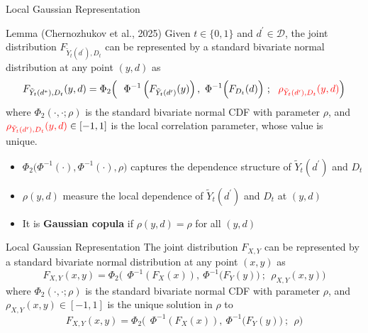 \documentclass[aspectratio=1610, 9pt]{beamer}
\begin{document}
\begin{frame}{Local Gaussian Representation}
\label{lemma:LGR}
    \begin{block}{Lemma (Chernozhukov et al., 2025)}
        Given $t\in\{0,1\}$ and $d^\prime\in\mathcal{D}$, the joint distribution $F_{\tilde{Y}_t(d^\prime),D_t}$ can be represented by a standard bivariate normal distribution at any point $(y,d)$ as
        $$F_{\tilde{Y}_{t}(d^{*}),D_{t}}(y,d)=\Phi_2\Big( \ 
        \ \Phi^{-1}\left(F_{\tilde{Y}_{t}(d^\prime)}(y) \right),\ \Phi^{-1}\Big( F_{D_t}(d)\Big) \ ;\ \ \textcolor{red}{\rho_{\tilde{Y}_{t}(d^\prime),D_{t}}(y,d)} \Big)$$ where $\Phi_2(\cdot,\cdot;\rho)$ is the standard bivariate normal CDF with parameter $\rho$, and $\textcolor{red}{\rho_{\tilde{Y}_{t}(d^\prime),D_{t}}(y,d)}\in[-1,1]$ is the local correlation parameter, whose value is unique.\ \ 
    \end{block}
    
    \vspace{0.4cm}
    \begin{itemize}
      \item $\Phi_2\Big(\Phi^{-1}(\cdot),\Phi^{-1}(\cdot),\rho\Big)$ captures the dependence structure of $\tilde{Y}_t(d^\prime)$ and $D_t$
      \item $\rho(y,d)$ measure the local dependence of $\tilde{Y}_t(d^\prime)$ and $D_t$ at $(y,d)$
      \item It is \textbf{Gaussian copula} if $\rho(y,d)=\rho$ for all $(y,d)$

    \end{itemize}
    \vspace{0.5cm}
\hyperlink{slides:LGR}{\beamerreturnbutton}
\end{frame}

\begin{frame}{Local Gaussian Representation} \label{def:LGR}
   The joint distribution $F_{X,Y}$ can be represented by a standard bivariate normal distribution at any point $(x,y)$ as
        $$F_{X,Y}(x,y)=\Phi_2\Big( \ 
        \ \Phi^{-1}\left(F_{X}(x) \right),\ \Phi^{-1}\Big( F_{Y}(y)\Big) \ ;\ \ \rho_{X,Y}(x,y)\Big)$$ where $\Phi_2(\cdot,\cdot;\rho)$ is the standard bivariate normal CDF with parameter $\rho$, and $\rho_{X,Y}(x,y)\in[-1,1]$ is the unique solution in $\rho$ to $$F_{X,Y}(x,y)=\Phi_2\Big( \ 
        \ \Phi^{-1}\left(F_{X}(x) \right),\ \Phi^{-1}\Big( F_{Y}(y)\Big) \ ;\ \ \rho\Big)$$

\vspace{1cm}
    \hyperlink{slides:LGR}{\beamerreturnbutton}
\end{frame}
\end{document}
